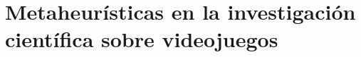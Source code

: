 \section{Metaheurísticas en la investigación científica sobre videojuegos} \label{sec:estado_arte}







